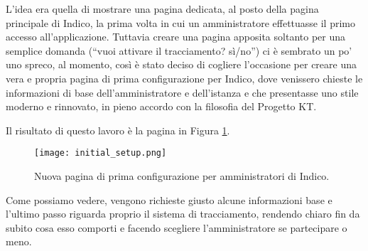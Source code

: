             L'idea era quella di mostrare una pagina dedicata, al posto della pagina principale di Indico, la prima volta in cui un amministratore effettuasse il primo accesso all'applicazione. Tuttavia creare una pagina apposita soltanto per una semplice domanda (``vuoi attivare il tracciamento? sì/no'') ci è sembrato un po' uno spreco, al momento, così è stato deciso di cogliere l'occasione per creare una vera e propria pagina di prima configurazione per Indico, dove venissero chieste le informazioni di base dell'amministratore e dell'istanza e che presentasse uno stile moderno e rinnovato, in pieno accordo con la filosofia del Progetto KT.
            
            Il risultato di questo lavoro è la pagina in Figura \ref{fig:initial_setup}.
            
        	\begin{figure}[h!]
        		\begin{center}
        			\texttt{[image: initial\_setup.png]}
        		\end{center}
        		\caption[Prima configurazione di Indico]{Nuova pagina di prima configurazione per amministratori di Indico.}
        		\label{fig:initial_setup}
        	\end{figure}
        	
        	Come possiamo vedere, vengono richieste giusto alcune informazioni base e l'ultimo passo riguarda proprio il sistema di tracciamento, rendendo chiaro fin da subito cosa esso comporti e facendo scegliere l'amministratore se partecipare o meno.
    